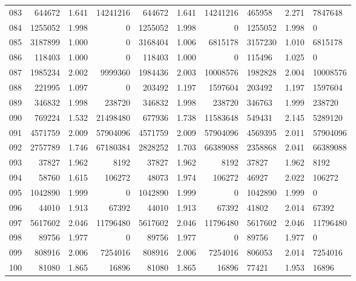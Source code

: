 \begin{longtable}{crrrrrr}
083 & 644672 & 1.641 & 14241216 & 644672 & 1.641 & 14241216 & 465958 & 2.271 & 7847648 \\
084 & 1255052 & 1.998 & 0 & 1255052 & 1.998 & 0 & 1255052 & 1.998 & 0 \\
085 & 3187899 & 1.000 & 0 & 3168404 & 1.006 & 6815178 & 3157230 & 1.010 & 6815178 \\
086 & 118403 & 1.000 & 0 & 118403 & 1.000 & 0 & 115496 & 1.025 & 0 \\
087 & 1985234 & 2.002 & 9999360 & 1984436 & 2.003 & 10008576 & 1982828 & 2.004 & 10008576 \\
088 & 221995 & 1.097 & 0 & 203492 & 1.197 & 1597604 & 203492 & 1.197 & 1597604 \\
089 & 346832 & 1.998 & 238720 & 346832 & 1.998 & 238720 & 346763 & 1.999 & 238720 \\
090 & 769224 & 1.532 & 21498480 & 677936 & 1.738 & 11583648 & 549431 & 2.145 & 5289120 \\
091 & 4571759 & 2.009 & 57904096 & 4571759 & 2.009 & 57904096 & 4569395 & 2.011 & 57904096 \\
092 & 2757789 & 1.746 & 67180384 & 2828252 & 1.703 & 66389088 & 2358868 & 2.041 & 66389088 \\
093 & 37827 & 1.962 & 8192 & 37827 & 1.962 & 8192 & 37827 & 1.962 & 8192 \\
094 & 58760 & 1.615 & 106272 & 48073 & 1.974 & 106272 & 46927 & 2.022 & 106272 \\
095 & 1042890 & 1.999 & 0 & 1042890 & 1.999 & 0 & 1042890 & 1.999 & 0 \\
096 & 44010 & 1.913 & 67392 & 44010 & 1.913 & 67392 & 41802 & 2.014 & 67392 \\
097 & 5617602 & 2.046 & 11796480 & 5617602 & 2.046 & 11796480 & 5617602 & 2.046 & 11796480 \\
098 & 89756 & 1.977 & 0 & 89756 & 1.977 & 0 & 89756 & 1.977 & 0 \\
099 & 808916 & 2.006 & 7254016 & 808916 & 2.006 & 7254016 & 806053 & 2.014 & 7254016 \\
100 & 81080 & 1.865 & 16896 & 81080 & 1.865 & 16896 & 77421 & 1.953 & 16896 \\
\end{longtable}

